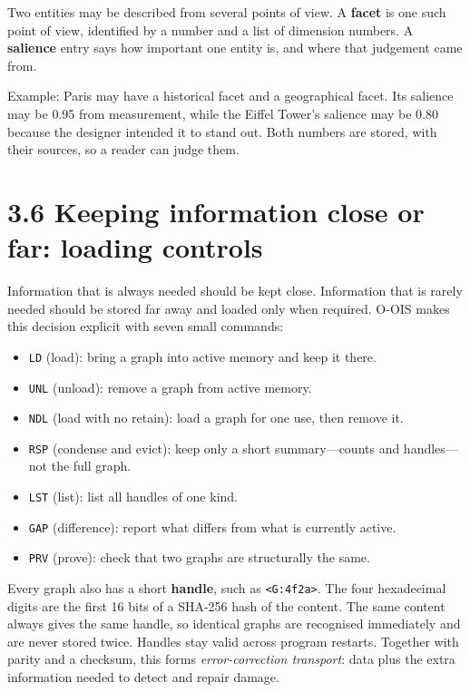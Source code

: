 Two entities may be described from several points of view. A \textbf{facet} is one such point of view, identified by a number and a list of dimension numbers. A \textbf{salience} entry says how important one entity is, and where that judgement came from.

Example: Paris may have a historical facet and a geographical facet. Its salience may be 0.95 from measurement, while the Eiffel Tower's salience may be 0.80 because the designer intended it to stand out. Both numbers are stored, with their sources, so a reader can judge them.

\section*{3.6 Keeping information close or far: loading controls}

Information that is always needed should be kept close. Information that is rarely needed should be stored far away and loaded only when required. O-OIS makes this decision explicit with seven small commands:

\begin{itemize}
\item \texttt{LD} (load): bring a graph into active memory and keep it there.
\item \texttt{UNL} (unload): remove a graph from active memory.
\item \texttt{NDL} (load with no retain): load a graph for one use, then remove it.
\item \texttt{RSP} (condense and evict): keep only a short summary---counts and handles---not the full graph.
\item \texttt{LST} (list): list all handles of one kind.
\item \texttt{GAP} (difference): report what differs from what is currently active.
\item \texttt{PRV} (prove): check that two graphs are structurally the same.
\end{itemize}

Every graph also has a short \textbf{handle}, such as \texttt{<G:4f2a>}. The four hexadecimal digits are the first 16 bits of a SHA-256 hash of the content. The same content always gives the same handle, so identical graphs are recognised immediately and are never stored twice. Handles stay valid across program restarts. Together with parity and a checksum, this forms \textit{error-correction transport}: data plus the extra information needed to detect and repair damage.

